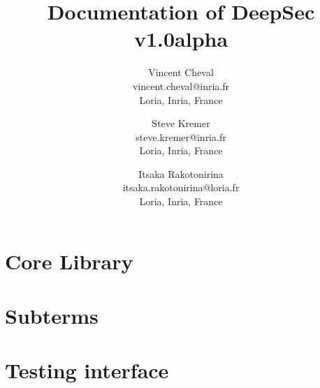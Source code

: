 \documentclass[a4paper,10pt]{book}
\title{Documentation of DeepSec v1.0alpha}
\author{
Vincent Cheval\\
vincent.cheval@inria.fr\\
Loria, Inria, France
\and
Steve Kremer\\
steve.kremer@inria.fr\\
Loria, Inria, France
\and
Itsaka Rakotonirina\\
itsaka.rakotonirina@loria.fr\\
Loria, Inria, France
}
\begin{document}
\maketitle

\tableofcontents

\chapter{Core Library}


\chapter{Subterms}


\chapter{Testing interface}




\end{document}

